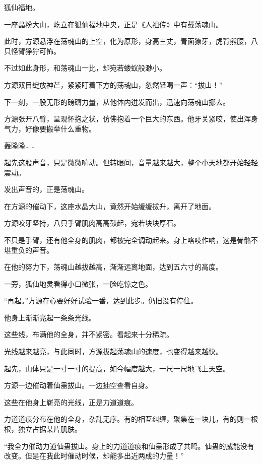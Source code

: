 
\begin{this_body}

狐仙福地。

一座晶粉大山，屹立在狐仙福地中央，正是《人祖传》中有载荡魂山。

此时，方源悬浮在荡魂山的上空，化为原形，身高三丈，青面獠牙，虎背熊腰，八只怪臂狰狞可怖。

不过如此身形，和荡魂山一比，却宛若蝼蚁般渺小。

方源双目绽放神芒，紧紧盯着下方的荡魂山，忽然轻喝一声：“拔山！”

下一刻，一股无形的磅礴力量，从他体内迸发而出，迅速向荡魂山挪去。

方源张开八臂，呈现怀抱之状，仿佛抱着一个巨大的东西。他牙关紧咬，使出浑身气力，好像要搬举什么重物。

轰隆隆……

起先这股声音，只是微微响动。但转眼间，音量越来越大，整个小天地都开始轻轻震动。

发出声音的，正是荡魂山。

在方源的催动下，这座水晶大山，竟然开始缓缓拔升，离开了地面。

方源咬牙坚持，八只手臂肌肉高高鼓起，宛若块块厚石。

不只是手臂，还有他全身的肌肉，都被完全调动起来。身上咯吱作响，这是骨骼不堪重负的声音。

在他的努力下，荡魂山越拔越高，渐渐远离地面，达到五六寸的高度。

一旁，狐仙地灵看得小口微张，一脸吃惊之色。

“再起。”方源存心要好好试验一番，达到此步。仍旧没有停住。

他身上渐渐亮起一条条光线。

这些线，布满他的全身，并不紧密。看起来十分稀疏。

光线越来越亮，与此同时，方源拔起荡魂山的速度，也变得越来越快。

起先，山体只是一寸一寸的提高，如今幅度越大，一尺一尺地飞上天空。

方源一边催动着仙蛊拔山。一边抽空查看自身。

这些在他身上崭亮的光线，正是力道道痕。

力道道痕分布在他的全身，杂乱无序。有的相互纠缠，聚集在一块儿，有的则一根根，独立占据某片肌肤。

“我全力催动力道仙蛊拔山。身上的力道道痕和仙蛊形成了共鸣。仙蛊的威能没有改变。但是在我此时催动时候，却能多出近两成的力量！”


\end{this_body}
